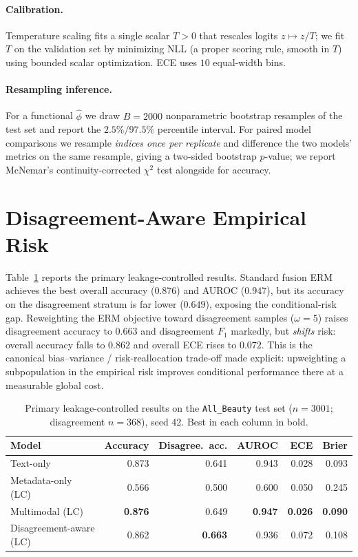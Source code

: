 \documentclass[11pt,a4paper]{article}
\begin{document}
\paragraph{Calibration.}
Temperature scaling fits a single scalar $T>0$ that rescales logits
$z \mapsto z/T$; we fit $T$ on the validation set by minimizing NLL (a proper
scoring rule, smooth in $T$) using bounded scalar optimization. ECE uses
$10$ equal-width bins.

\paragraph{Resampling inference.}
For a functional $\hat\phi$ we draw $B=2000$ nonparametric bootstrap resamples of
the test set and report the $2.5\%/97.5\%$ percentile interval. For paired model
comparisons we resample \emph{indices once per replicate} and difference the two
models' metrics on the same resample, giving a two-sided bootstrap $p$-value; we
report McNemar's continuity-corrected $\chi^2$ test alongside for accuracy.

\section{Disagreement-Aware Empirical Risk}
\label{sec:da-erm}

Table~\ref{tab:main} reports the primary leakage-controlled results.
Standard fusion ERM achieves the best overall accuracy ($0.876$) and AUROC
($0.947$), but its accuracy on the disagreement stratum is far lower ($0.649$),
exposing the conditional-risk gap. Reweighting the ERM objective toward
disagreement samples ($\omega=5$) raises disagreement accuracy to $0.663$ and
disagreement $F_1$ markedly, but \emph{shifts} risk: overall accuracy falls to
$0.862$ and overall ECE rises to $0.072$. This is the canonical bias--variance /
risk-reallocation trade-off made explicit: upweighting a subpopulation in the
empirical risk improves conditional performance there at a measurable global
cost.

\begin{table}[t]
\centering
\caption{Primary leakage-controlled results on the \texttt{All\_Beauty} test set
($n=3001$; disagreement $n=368$), seed 42. Best in each column in bold.}
\label{tab:main}
\begin{tabular}{lrrrrr}
\toprule
Model & Accuracy & Disagree.\ acc. & AUROC & ECE & Brier \\
\midrule
Text-only             & 0.873 & 0.641 & 0.943 & 0.028 & 0.093 \\
Metadata-only (LC)    & 0.566 & 0.500 & 0.600 & 0.050 & 0.245 \\
Multimodal (LC)       & \textbf{0.876} & 0.649 & \textbf{0.947} & \textbf{0.026} & \textbf{0.090} \\
Disagreement-aware (LC) & 0.862 & \textbf{0.663} & 0.936 & 0.072 & 0.108 \\
\bottomrule
\end{tabular}
\end{table}
\end{document}
